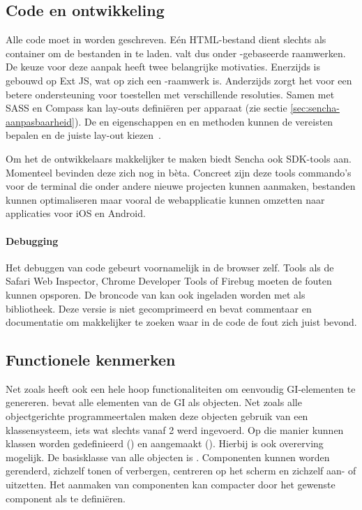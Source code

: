 \subsection{Code en ontwikkeling}
Alle code moet in \js{} worden geschreven.
Eén HTML-bestand dient slechts als container om de bestanden in te laden.  
\st{} valt dus onder \js{}-gebaseerde raamwerken.  
De keuze voor deze aanpak heeft twee belangrijke motivaties.  
Enerzijds is \st{} gebouwd op Ext JS,  wat op zich een \js{}-raamwerk is.  
Anderzijds zorgt het voor een betere ondersteuning voor toestellen met verschillende resoluties.  
Samen met SASS en Compass kan \st{} lay-outs definiëren per apparaat (zie sectie \ref{sec:sencha-aanpasbaarheid}).  
De  en  eigenschappen en  en  methoden kunnen de vereisten bepalen en de juiste lay-out kiezen~\cite{JohnEClark2012}.

Om het de ontwikkelaars makkelijker te maken biedt Sencha ook SDK-tools aan.  
Momenteel bevinden deze zich nog in bèta.  
Concreet zijn deze tools commando's voor de terminal die onder andere nieuwe projecten kunnen aanmaken, \js{} bestanden kunnen optimaliseren maar vooral de webapplicatie kunnen omzetten naar  applicaties voor iOS en Android.

\paragraph{Debugging}
Het debuggen van code gebeurt voornamelijk in de browser zelf.  
Tools als de Safari Web Inspector,  Chrome Developer Tools of Firebug moeten de fouten kunnen opsporen.  
De broncode van \st{} kan ook ingeladen worden met  als bibliotheek.  
Deze versie is niet gecomprimeerd en bevat commentaar en documentatie om makkelijker te zoeken waar in de code de fout zich juist bevond.

\subsection{Functionele kenmerken}
Net zoals \jqm{} heeft \st{} ook een hele hoop functionaliteiten om eenvoudig GI-elementen te genereren.  
\st{} bevat alle elementen van de GI als \js{} objecten.  
Net zoals alle objectgerichte programmeertalen maken deze objecten gebruik van een klassensysteem,  iets wat slechts vanaf \st{} 2 werd ingevoerd.  
Op die manier kunnen klassen worden gedefinieerd () en aangemaakt ().  
Hierbij is ook overerving mogelijk.  
De basisklasse van alle objecten is .  
Componenten kunnen worden gerenderd, zichzelf tonen of verbergen,  centreren op het scherm en zichzelf aan- of uitzetten.   
Het aanmaken van componenten kan compacter door het gewenste component als  te definiëren.  

